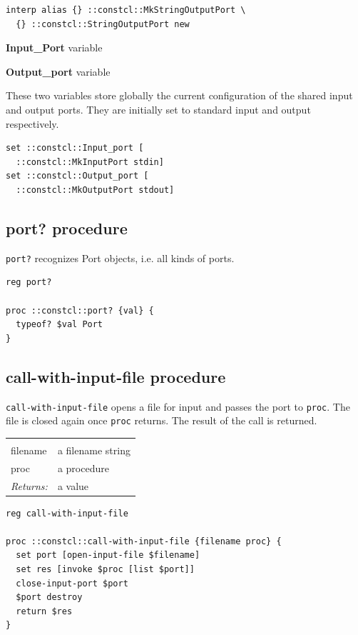 \documentclass[twoside]{report}
\begin{document}
\begin{lstlisting}
interp alias {} ::constcl::MkStringOutputPort \
  {} ::constcl::StringOutputPort new
\end{lstlisting}

\textbf{Input\_Port} variable

\textbf{Output\_port} variable

These two variables store globally the current configuration of the shared input and output ports. They are initially set to standard input and output respectively.

\begin{lstlisting}
set ::constcl::Input_port [
  ::constcl::MkInputPort stdin]
set ::constcl::Output_port [
  ::constcl::MkOutputPort stdout]
\end{lstlisting}

\subsection{port? procedure}
\label{port-procedure}

\texttt{port?} recognizes Port objects, i.e. all kinds of ports.

\begin{lstlisting}
reg port?

proc ::constcl::port? {val} {
  typeof? $val Port
}
\end{lstlisting}

\subsection{call-with-input-file procedure}
\label{callwithinputfile-procedure}

\texttt{call-with-input-file} opens a file for input and passes the port to \texttt{proc}. The file is closed again once \texttt{proc} returns. The result of the call is returned.

\noindent\begin{tabular}{ |p{1.9cm} p{8cm}| }
\hline
\rowcolor[HTML]{CCCCCC} \multicolumn{2}{|l|}{\bf call-with-input-file (public)} \\
filename & a filename string \\
proc & a procedure \\
\textit{Returns:} & a value \\
\hline
\end{tabular}

\begin{lstlisting}
reg call-with-input-file

proc ::constcl::call-with-input-file {filename proc} {
  set port [open-input-file $filename]
  set res [invoke $proc [list $port]]
  close-input-port $port
  $port destroy
  return $res
}
\end{lstlisting}
\end{document}
